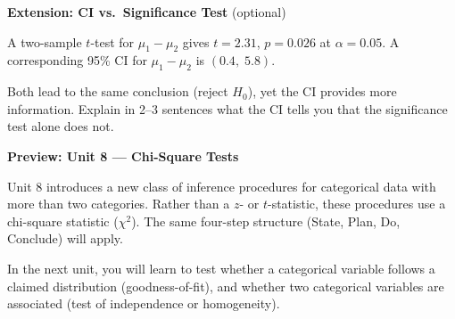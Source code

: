 \documentclass[10pt]{article}
\begin{document}
\begin{extensionbox}
\textbf{Extension: CI vs.\ Significance Test} (optional)

A two-sample $t$-test for $\mu_1 - \mu_2$ gives $t = 2.31$, $p = 0.026$ at $\alpha = 0.05$.
A corresponding 95\% CI for $\mu_1 - \mu_2$ is $(0.4,\; 5.8)$.

Both lead to the same conclusion (reject $H_0$), yet the CI provides more information. Explain
in 2--3 sentences what the CI tells you that the significance test alone does not.
\end{extensionbox}

\begin{reflectionbox}
\textbf{Preview: Unit 8 --- Chi-Square Tests}

Unit 8 introduces a new class of inference procedures for categorical data with more than two
categories. Rather than a $z$- or $t$-statistic, these procedures use a chi-square statistic
($\chi^2$). The same four-step structure (State, Plan, Do, Conclude) will apply.

In the next unit, you will learn to test whether a categorical variable follows a claimed
distribution (goodness-of-fit), and whether two categorical variables are associated
(test of independence or homogeneity).
\end{reflectionbox}
\end{document}
